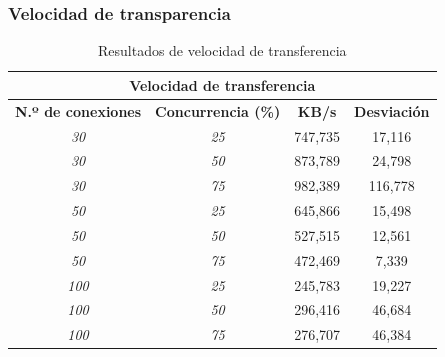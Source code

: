 \subsubsection{Velocidad de transparencia}
\begin{table}[!ht]
	\begin{center}
		\begin{tabular}{|c|c|c|c|}
			\hline
			\multicolumn{4}{|c|}{{\bf Velocidad de transferencia}}                            \\ \hline
			{\bf N.º de conexiones} & {\bf Concurrencia (\%)} & {\bf KB/s} & {\bf Desviación} \\ \hline
			{\it 30}                & {\it 25}                & 747,735    & 17,116           \\ \hline
			{\it 30}                & {\it 50}                & 873,789    & 24,798           \\ \hline
			{\it 30}                & {\it 75}                & 982,389    & 116,778          \\ \hline
			{\it 50}                & {\it 25}                & 645,866    & 15,498           \\ \hline
			{\it 50}                & {\it 50}                & 527,515    & 12,561           \\ \hline
			{\it 50}                & {\it 75}                & 472,469    & 7,339            \\ \hline
			{\it 100}               & {\it 25}                & 245,783    & 19,227           \\ \hline
			{\it 100}               & {\it 50}                & 296,416    & 46,684           \\ \hline
			{\it 100}               & {\it 75}                & 276,707    & 46,384           \\ \hline
		\end{tabular}
		\caption{Resultados de velocidad de transferencia}
		\label{table:rvt}
	\end{center}
\end{table}

